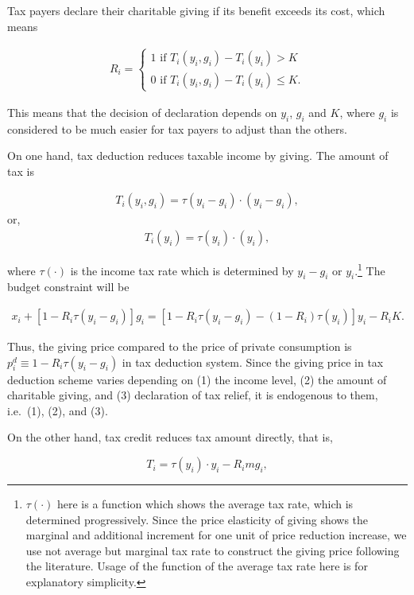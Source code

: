 \documentclass[
  11pt,
  a4paper,
]{article}
\begin{document}
Tax payers declare their charitable giving if its benefit exceeds its cost, which means

\begin{align}
R_i=\begin{cases}
1 \text{ if }T_i(y_i, g_i) - T_i(y_i)>K\\
0 \text{ if }T_i(y_i, g_i) - T_i(y_i)\le K.
\end{cases}
\end{align}

This means that the decision of declaration depends on \(y_i\), \(g_i\) and \(K\), where \(g_i\) is considered to be much easier for tax payers to adjust than the others.

On one hand, tax deduction reduces taxable income by giving. The amount of tax is

\begin{align}
    T_i(y_i, g_i) = \tau(y_i - g_i) \cdot (y_i - g_i),
\end{align}
or,
\begin{align}
    T_i(y_i) = \tau(y_i) \cdot (y_i),
\end{align}

where \(\tau(\cdot)\) is the income tax rate which is determined by \(y_i - g_i\) or \(y_i\).\footnote{\(\tau(\cdot)\) here is a function which shows the average tax rate, which is determined progressively. Since the price elasticity of giving shows the marginal and additional increment for one unit of price reduction increase, we use not average but marginal tax rate to construct the giving price following the literature. Usage of the function of the average tax rate here is for explanatory simplicity.} The budget constraint will be

\begin{align}
    x_i + [1 - R_i\tau(y_i - g_i)]g_i = [1 - R_i\tau(y_i - g_i)-(1-R_i)\tau(y_i)] y_i− R_iK.
\end{align}

Thus, the giving price compared to the price of private consumption is \(p_i^{d} \equiv 1 - R_i\tau(y_i - g_i)\) in tax deduction system. Since the giving price in tax deduction scheme varies depending on (1) the income level, (2) the amount of charitable giving, and (3) declaration of tax relief, it is endogenous to them, i.e.~(1), (2), and (3).

On the other hand, tax credit reduces tax amount directly, that is,

\[
    T_i = \tau(y_i)\cdot y_i - R_im g_i ,
\]
\end{document}
